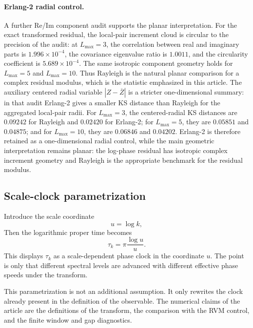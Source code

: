 \documentclass[12pt]{article}
\numberwithin{equation}{section}
\begin{document}
\paragraph{Erlang-2 radial control.}
\label{par:erlang2_radial_control}
A further Re/Im component audit supports the planar interpretation.  For the exact transformed residual, the local-pair increment cloud is circular to the precision of the audit: at \(L_{\max}=3\), the correlation between real and imaginary parts is \(1.996\times10^{-4}\), the covariance eigenvalue ratio is \(1.0011\), and the circularity coefficient is \(5.689\times10^{-4}\).  The same isotropic component geometry holds for \(L_{\max}=5\) and \(L_{\max}=10\).  Thus Rayleigh is the natural planar comparison for a complex residual modulus, which is the statistic emphasized in this article.  The auxiliary centered radial variable \(|Z-\overline Z|\) is a stricter one-dimensional summary: in that audit Erlang-2 gives a smaller KS distance than Rayleigh for the aggregated local-pair radii.  For \(L_{\max}=3\), the centered-radial KS distances are \(0.09242\) for Rayleigh and \(0.02420\) for Erlang-2; for \(L_{\max}=5\), they are \(0.05851\) and \(0.04875\); and for \(L_{\max}=10\), they are \(0.06846\) and \(0.04202\).  Erlang-2 is therefore retained as a one-dimensional radial control, while the main geometric interpretation remains planar: the log-phase residual has isotropic complex increment geometry and Rayleigh is the appropriate benchmark for the residual modulus.


\subsection{Scale-clock parametrization}
\label{sec:optional_scale_clock_interpretation}

\noindent Introduce the scale coordinate
\begin{equation}
u=
\log k,
\label{eq:scale_coordinate_u}
\end{equation}
Then the logarithmic proper time becomes
\begin{equation}
\tau_k
=
\pi\frac{\log u}{u}.
\label{eq:proper_time_scale_coordinate}
\end{equation}
This displays \(\tau_k\) as a scale-dependent phase clock in the coordinate \(u\).  The point is only that different spectral levels are advanced with different effective phase speeds under the transform.


\noindent This parametrization is not an additional assumption.  It only rewrites the clock already present in the definition of the observable.  The numerical claims of the article are the definitions of the transform, the comparison with the RVM control, and the finite window and gap diagnostics.
\end{document}
